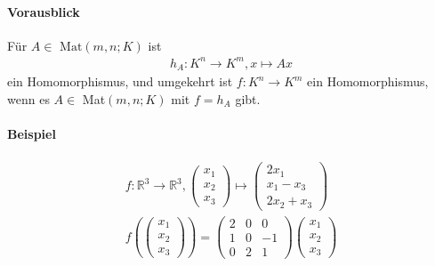 \documentclass[11pt]{report}
\newcommand*\Zb[1] {\mathbb{#1}}
\begin{document}
\paragraph{Vorausblick}
Für $A \in \text{ Mat}(m, n; K)$ ist
\begin{align}
 h_A : K^n \rightarrow K^m, x \mapsto Ax
\end{align}
ein Homomorphismus, und umgekehrt ist $f: K^n \rightarrow K^m$ ein Homomorphismus, wenn es $A \in $ Mat$(m,n;K)$ mit $f= h_A$ gibt.

\paragraph{Beispiel}
\begin{align}
 f: \Zb{R}^3 \rightarrow \Zb{R}^3, \begin{pmatrix} x_1 \\ x_2 \\ x_3  \end{pmatrix} \mapsto \begin{pmatrix} 2x_1 \\ x_1 - x_3 \\ 2x_2 + x_3 \end{pmatrix} \\
f(\begin{pmatrix} x_1 \\ x_2 \\ x_3 \end{pmatrix}) = \begin{pmatrix} 2 & 0 & 0 \\ 1 & 0 & -1 \\ 0 & 2 & 1 \end{pmatrix}\begin{pmatrix} x_1 \\ x_2 \\ x_3 \end{pmatrix}
\end{align}
\end{document}
